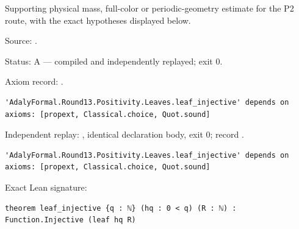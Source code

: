 \begin{theorem}[bp-439]
\label{bp-439}
\leanok
Supporting physical mass, full-color or periodic-geometry estimate for the P2 route, with the exact hypotheses displayed below.

\par Source: \texttt{}.
\par Status: A — compiled and independently replayed; exit 0.
\par Axiom record: \texttt{}.
\begin{verbatim}
'AdalyFormal.Round13.Positivity.Leaves.leaf_injective' depends on axioms: [propext, Classical.choice, Quot.sound]
\end{verbatim}
\par Independent replay: \texttt{}, identical declaration body, exit 0; record \texttt{}.
\begin{verbatim}
'AdalyFormal.Round13.Positivity.Leaves.leaf_injective' depends on axioms: [propext, Classical.choice, Quot.sound]
\end{verbatim}
\par Exact Lean signature:
\begin{verbatim}
theorem leaf_injective {q : ℕ} (hq : 0 < q) (R : ℕ) : Function.Injective (leaf hq R)
\end{verbatim}
\end{theorem}

